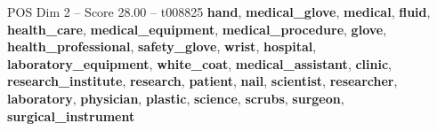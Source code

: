 \begin{textsample}{POS Dim 2 – Score 28.00 – t008825}  \label{ex:f2_pos_032}
\textbf{hand}, \textbf{medical\_glove}, \textbf{medical}, \textbf{fluid}, \textbf{health\_care}, \textbf{medical\_equipment}, \textbf{medical\_procedure}, \textbf{glove}, \textbf{health\_professional}, \textbf{safety\_glove}, \textbf{wrist}, \textbf{hospital}, \textbf{laboratory\_equipment}, \textbf{white\_coat}, \textbf{medical\_assistant}, \textbf{clinic}, \textbf{research\_institute}, \textbf{research}, \textbf{patient}, \textbf{nail}, \textbf{scientist}, \textbf{researcher}, \textbf{laboratory}, \textbf{physician}, \textbf{plastic}, \textbf{science}, \textbf{scrubs}, \textbf{surgeon}, \textbf{surgical\_instrument}

\end{textsample}
